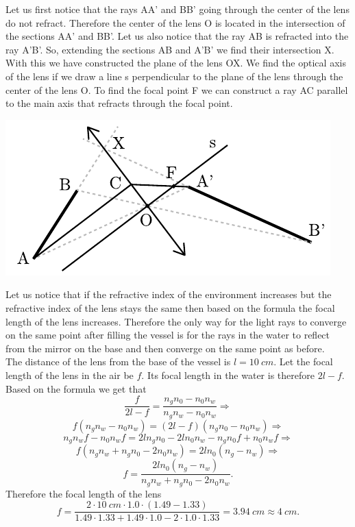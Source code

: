 \documentclass[11pt]{article}
\begin{document}
\solueng
Let us first notice that the rays AA’ and BB’ going through the center of the lens do not refract. Therefore the center of the lens O is located in the intersection of the sections AA’ and BB’. Let us also notice that the ray AB is refracted into the ray A’B’. So, extending the sections AB and A’B’ we find their intersection X. With this we have constructed the plane of the lens OX. We find the optical axis of the lens if we draw a line s perpendicular to the plane of the lens through the center of the lens O. To find the focal point F we can construct a ray AC parallel to the main axis that refracts through the focal point. 
\begin{center}
\includegraphics[width=\textwidth]{2015-lahg-05-laatsLahendus}
\end{center}
\probend
\bigskip


\solueng
Let us notice that if the refractive index of the environment increases but the refractive index of the lens stays the same then based on the formula the focal length of the lens increases. Therefore the only way for the light rays to converge on the same point after filling the vessel is for the rays in the water to reflect from the mirror on the base and then converge on the same point as before.\\
The distance of the lens from the base of the vessel is $l = \SI{10}{cm}$. Let the focal length of the lens in the air be $f$. Its focal length in the water is therefore $2l-f$. Based on the formula we get that
\[ \frac{f}{2l-f} = \frac{n_g n_0 - n_0 n_w}{n_g n_w - n_0 n_w}\Rightarrow \] 
\[ f(n_g n_w - n_0 n_w) = (2l-f)(n_g n_0 - n_0 n_w)\Rightarrow \]
\[ n_g n_w f - n_0 n_w f = 2l n_g n_0 - 2l n_0 n_w - n_g n_0 f + n_0 n_w f\Rightarrow \]
\[ f (n_g n_w + n_g n_0 - 2 n_0 n_w) = 2l n_0 (n_g - n_w)\Rightarrow \]
\[ f = \frac{2l n_0 (n_g - n_w)}{n_g n_w + n_g n_0 - 2 n_0 n_w}. \]
Therefore the focal length of the lens
\[ f = \frac{\num{2} \cdot \SI{10}{cm} \cdot \num{1,0} \cdot (\num{1,49} - \num{1,33})}{\num{1,49}
\cdot \num{1,33} + \num{1,49} \cdot \num{1,0} - \num{2} \cdot \num{1,0} \cdot \num{1,33}} = \SI{3,94}{cm}
\approx \SI{4}{cm}. \]
\probend
\bigskip
\end{document}
